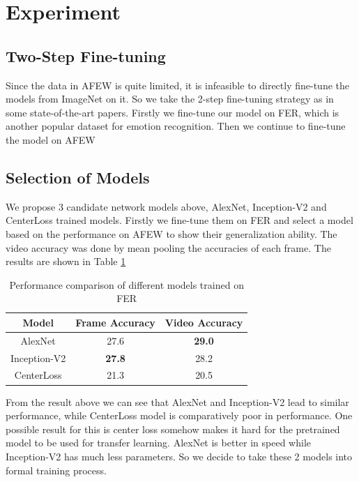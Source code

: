 \documentclass[10pt,twocolumn,letterpaper]{article}
\begin{document}
\section{Experiment}

\subsection{Two-Step Fine-tuning}

Since the data in AFEW is quite limited, it is infeasible to directly fine-tune the models from ImageNet on it. So we take the 2-step fine-tuning strategy as in some state-of-the-art papers. Firstly we fine-tune our model on FER, which is another popular dataset for emotion recognition. Then we continue to fine-tune the model on AFEW

\subsection{Selection of Models}

We propose 3 candidate network models above, AlexNet, Inception-V2 and CenterLoss trained models. Firstly we fine-tune them on FER and select a model based on the performance on AFEW to show their generalization ability. The video accuracy was done by mean pooling the accuracies of each frame. The results are shown in Table \ref{tableSel}


\begin{table}[t]
\begin{center}
\vspace*{5pt}
\begin{tabular}{|c|c|c|}
\hline
\textbf{Model} & \textbf{Frame Accuracy} & \textbf{Video Accuracy} \\
\hline\hline
AlexNet & 27.6 & \textbf{29.0} \\
Inception-V2 & \textbf{27.8} & 28.2 \\
CenterLoss & 21.3 & 20.5 \\ 
\hline
\end{tabular}
\end{center}
\caption{Performance comparison of different models trained on FER}
\label{tableSel}

\end{table}

From the result above we can see that AlexNet and Inception-V2 lead to similar performance, while CenterLoss model is comparatively poor in performance. One possible result for this is center loss somehow makes it hard for the pretrained model to be used for transfer learning. AlexNet is better in speed while Inception-V2 has much less parameters. So we decide to take these 2 models into formal training process.
\end{document}
